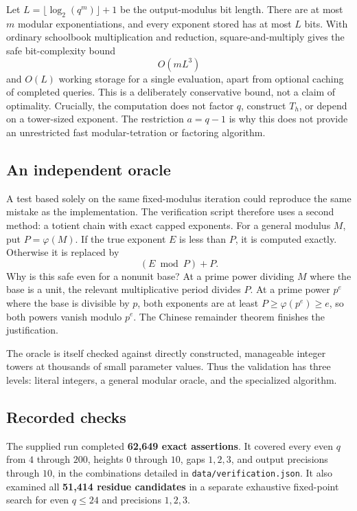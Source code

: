 \documentclass[11pt,a4paper]{article}
\numberwithin{equation}{section}
\theoremstyle{plain}
\theoremstyle{definition}
\begin{document}
Let $L=\lfloor\log_2(q^m)\rfloor+1$ be the output-modulus bit length.
There are at most $m$ modular exponentiations, and every exponent stored
has at most $L$ bits.  With ordinary schoolbook multiplication and
reduction, square-and-multiply gives the safe bit-complexity bound
\[
 O(mL^3)
\]
and $O(L)$ working storage for a single evaluation, apart from optional
caching of completed queries.  This is a deliberately conservative
bound, not a claim of optimality.  Crucially, the computation does not
factor $q$, construct $T_h$, or depend on a tower-sized exponent.
The restriction $a=q-1$ is why this does not provide an unrestricted
fast modular-tetration or factoring algorithm.

\subsection{An independent oracle}
A test based solely on the same fixed-modulus iteration could reproduce
the same mistake as the implementation.  The verification script therefore
uses a second method: a totient chain with exact capped exponents.
For a general modulus $M$, put $P=\varphi(M)$.  If the true exponent
$E$ is less than $P$, it is computed exactly.  Otherwise it is replaced by
\[
 (E\bmod P)+P.
\]
Why is this safe even for a nonunit base?  At a prime power dividing $M$
where the base is a unit, the relevant multiplicative period divides
$P$.  At a prime power $p^e$ where the base is divisible by $p$, both
exponents are at least $P\ge\varphi(p^e)\ge e$, so both powers vanish
modulo $p^e$.  The Chinese remainder theorem finishes the justification.

The oracle is itself checked against directly constructed, manageable
integer towers at thousands of small parameter values.  Thus the
validation has three levels: literal integers, a general modular oracle,
and the specialized algorithm.

\subsection{Recorded checks}
The supplied run completed \textbf{62,649 exact assertions}.  It covered
every even $q$ from $4$ through $200$, heights $0$ through $10$, gaps
$1,2,3$, and output precisions through $10$, in the combinations detailed
in \texttt{data/verification.json}.  It also examined all
\textbf{51,414 residue candidates} in a separate exhaustive fixed-point
search for even $q\le24$ and precisions $1,2,3$.
\end{document}
